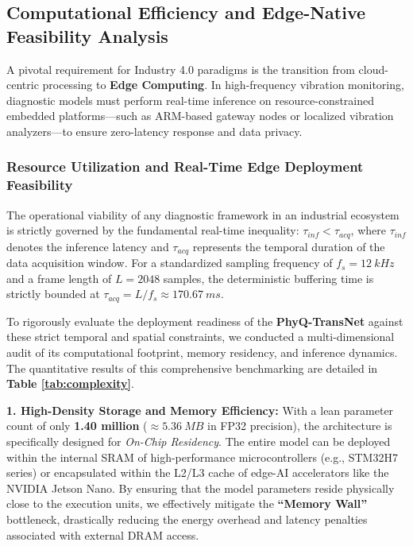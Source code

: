 \documentclass[5p,times,twocolumn]{elsarticle}
\begin{document}
\subsection{Computational Efficiency and Edge-Native Feasibility Analysis}
A pivotal requirement for Industry 4.0 paradigms is the transition from cloud-centric processing to \textbf{Edge Computing}. In high-frequency vibration monitoring, diagnostic models must perform real-time inference on resource-constrained embedded platforms---such as ARM-based gateway nodes or localized vibration analyzers---to ensure zero-latency response and data privacy. 



\subsubsection{Resource Utilization and Real-Time Edge Deployment Feasibility}
The operational viability of any diagnostic framework in an industrial ecosystem is strictly governed by the fundamental real-time inequality: $\tau_{inf} < \tau_{acq}$, where $\tau_{inf}$ denotes the inference latency and $\tau_{acq}$ represents the temporal duration of the data acquisition window. For a standardized sampling frequency of $f_s = \SI{12}{kHz}$ and a frame length of $L=2048$ samples, the deterministic buffering time is strictly bounded at $\tau_{acq} = L/f_s \approx \SI{170.67}{ms}$. 

To rigorously evaluate the deployment readiness of the \textbf{PhyQ-TransNet} against these strict temporal and spatial constraints, we conducted a multi-dimensional audit of its computational footprint, memory residency, and inference dynamics. The quantitative results of this comprehensive benchmarking are detailed in \textbf{Table \ref{tab:complexity}}.

\textbf{1. High-Density Storage and Memory Efficiency:} 
With a lean parameter count of only \textbf{1.40 million} ($\approx \SI{5.36}{MB}$ in FP32 precision), the architecture is specifically designed for \textit{On-Chip Residency}. The entire model can be deployed within the internal SRAM of high-performance microcontrollers (e.g., STM32H7 series) or encapsulated within the L2/L3 cache of edge-AI accelerators like the NVIDIA Jetson Nano. By ensuring that the model parameters reside physically close to the execution units, we effectively mitigate the \textbf{``Memory Wall''} bottleneck, drastically reducing the energy overhead and latency penalties associated with external DRAM access.
\end{document}
